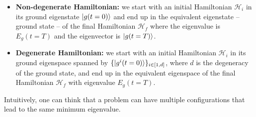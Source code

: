 \begin{itemize}
    \item \textbf{Non-degenerate Hamiltonian:} we start with an initial Hamiltonian $\mathcal{H}_{i}$ in its ground eigenstate $\ket{g(t=0)}$ and end up in the equivalent eigenstate -- ground state -- of the final Hamiltonian $\mathcal{H}_{f}$ where the eigenvalue is $E_{g}(t=T)$ and the eigenvector is $\ket{g(t=T)}$.
    \item \textbf{Degenerate Hamiltonian:} we start with an initial Hamiltonian $\mathcal{H}_{i}$ in its ground eigenspace spanned by $\{\ket{g^{i}(t=0)}\}_{i \in \left[1,d\right]}$, where $d$ is the degeneracy of the ground state, and end up in the equivalent eigenspace of the final Hamiltonian $\mathcal{H}_{f}$ with eigenvalue $E_{g}(t=T)$.
\end{itemize}
Intuitively, one can think that a problem can have multiple configurations that lead to the same minimum eigenvalue.
